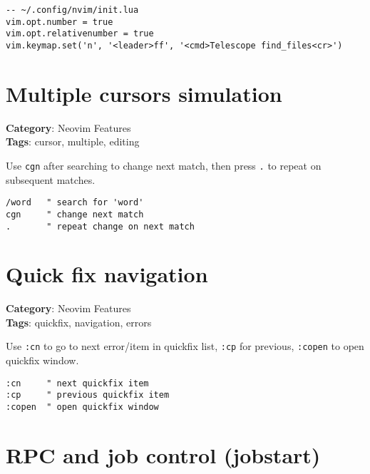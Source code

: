 {{{{{{{{{{\begin{Exa*}{}
\begin{Verbatim}[fontsize=\footnotesize, breaklines, breakanywhere]
-- ~/.config/nvim/init.lua
vim.opt.number = true
vim.opt.relativenumber = true
vim.keymap.set('n', '<leader>ff', '<cmd>Telescope find_files<cr>')
\end{Verbatim}
\end{Exa*}

\section{Multiple cursors simulation}

\textbf{Category}: Neovim Features\\ \textbf{Tags}: cursor, multiple, editing
\vspace{0.5cm}

Use {\footnotesize \Verb§cgn§} after searching to change next match, then press {\footnotesize \Verb§.§} to repeat on subsequent matches.

\begin{Exa*}{}
\begin{Verbatim}[fontsize=\footnotesize, breaklines, breakanywhere]
/word   " search for 'word'
cgn     " change next match
.       " repeat change on next match
\end{Verbatim}
\end{Exa*}

\section{Quick fix navigation}

\textbf{Category}: Neovim Features\\ \textbf{Tags}: quickfix, navigation, errors
\vspace{0.5cm}

Use {\footnotesize \Verb§:cn§} to go to next error/item in quickfix list, {\footnotesize \Verb§:cp§} for previous, {\footnotesize \Verb§:copen§} to open quickfix window.

\begin{Exa*}{}
\begin{Verbatim}[fontsize=\footnotesize, breaklines, breakanywhere]
:cn     " next quickfix item
:cp     " previous quickfix item
:copen  " open quickfix window
\end{Verbatim}
\end{Exa*}

\section{RPC and job control (jobstart)}

}}}}}}}}}}
